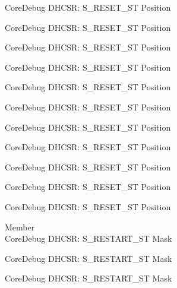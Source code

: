 \begin{DoxyRefList}
\label{deprecated__deprecated000381}%
%
Core\+Debug DHCSR\+: S\+\_\+\+RESET\+\_\+\+ST Position 

\label{deprecated__deprecated000460}%
%
Core\+Debug DHCSR\+: S\+\_\+\+RESET\+\_\+\+ST Position 

\label{deprecated__deprecated000562}%
%
Core\+Debug DHCSR\+: S\+\_\+\+RESET\+\_\+\+ST Position 

\label{deprecated__deprecated000668}%
%
Core\+Debug DHCSR\+: S\+\_\+\+RESET\+\_\+\+ST Position 

\label{deprecated__deprecated000768}%
%
Core\+Debug DHCSR\+: S\+\_\+\+RESET\+\_\+\+ST Position 

\label{deprecated__deprecated000822}%
%
Core\+Debug DHCSR\+: S\+\_\+\+RESET\+\_\+\+ST Position 

\label{deprecated__deprecated000907}%
%
Core\+Debug DHCSR\+: S\+\_\+\+RESET\+\_\+\+ST Position 

\label{deprecated__deprecated000964}%
%
Core\+Debug DHCSR\+: S\+\_\+\+RESET\+\_\+\+ST Position 

\label{deprecated__deprecated001040}%
%
Core\+Debug DHCSR\+: S\+\_\+\+RESET\+\_\+\+ST Position 

\label{deprecated__deprecated001119}%
%
Core\+Debug DHCSR\+: S\+\_\+\+RESET\+\_\+\+ST Position 

\label{deprecated__deprecated001221}%
%
Core\+Debug DHCSR\+: S\+\_\+\+RESET\+\_\+\+ST Position  
\item[Member \doxylink{group___c_m_s_i_s___s_c_b_gabe3254d40aaa482987ff31584d2a3240}{Core\+Debug\+\_\+\+DHCSR\+\_\+\+S\+\_\+\+RESTART\+\_\+\+ST\+\_\+\+Msk} ]\hfill \\
\label{deprecated__deprecated000008}%
%
Core\+Debug DHCSR\+: S\+\_\+\+RESTART\+\_\+\+ST Mask 

\label{deprecated__deprecated000108}%
%
Core\+Debug DHCSR\+: S\+\_\+\+RESTART\+\_\+\+ST Mask 

\label{deprecated__deprecated000162}%
%
Core\+Debug DHCSR\+: S\+\_\+\+RESTART\+\_\+\+ST Mask 


\end{DoxyRefList}

